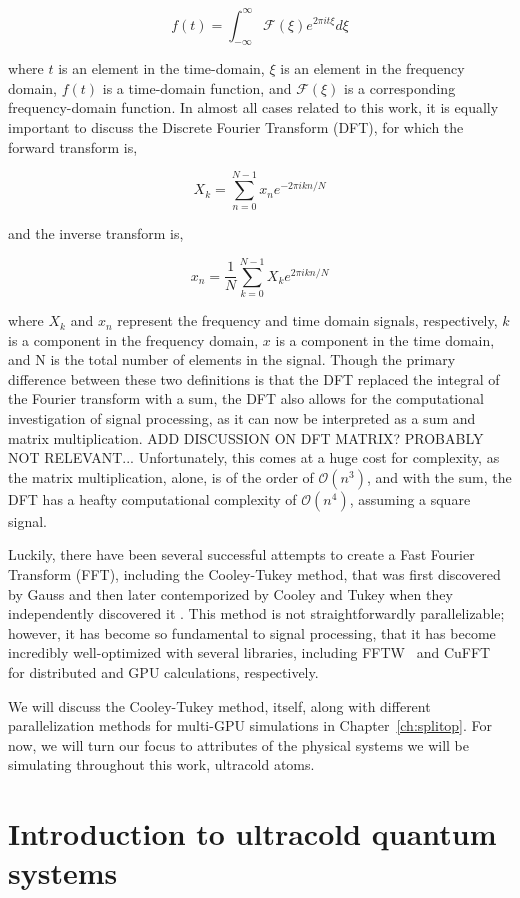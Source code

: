 $$
f(t) = \int_{-\infty}^{\infty}\mathcal{F}(\xi)e^{2\pi i t \xi}d\xi
$$

\noindent where $t$ is an element in the time-domain, $\xi$ is an element in the frequency domain, $f(t)$ is a time-domain function, and $\mathcal{F}(\xi)$ is a corresponding frequency-domain function.
In almost all cases related to this work, it is equally important to discuss the Discrete Fourier Transform (DFT), for which the forward transform is,

$$
X_k = \sum_{n=0}^{N-1} x_n e^{-2 \pi i k n / N}
$$

\noindent and the inverse transform is,

$$
x_n = \frac{1}{N} \sum_{k=0}^{N-1} X_k e^{2 \pi i k n / N}
$$

\noindent where $X_k$ and $x_n$ represent the frequency and time domain signals, respectively, $k$ is a component in the frequency domain, $x$ is a component in the time domain, and N is the total number of elements in the signal.
Though the primary difference between these two definitions is that the DFT replaced the integral of the Fourier transform with a sum, the DFT also allows for the computational investigation of signal processing, as it can now be interpreted as a sum and matrix multiplication.
ADD DISCUSSION ON DFT MATRIX? PROBABLY NOT RELEVANT...
Unfortunately, this comes at a huge cost for complexity, as the matrix multiplication, alone, is of the order of $\mathcal{O}(n^3)$, and with the sum, the DFT has a heafty computational complexity of $\mathcal{O}(n^4)$, assuming a square signal.

Luckily, there have been several successful attempts to create a Fast Fourier Transform (FFT), including the Cooley-Tukey method, that was first discovered by Gauss and then later contemporized by Cooley and Tukey when they independently discovered it \cite{cooley1965}.
This method is not straightforwardly parallelizable; however, it has become so fundamental to signal processing, that it has become incredibly well-optimized with several libraries, including FFTW~\cite{frigo1998} and CuFFT~\cite{fatica2008} for distributed and GPU calculations, respectively.

We will discuss the Cooley-Tukey method, itself, along with different parallelization methods for multi-GPU simulations in Chapter~\ref{ch:splitop}.
For now, we will turn our focus to attributes of the physical systems we will be simulating throughout this work, ultracold atoms.

\section{Introduction to ultracold quantum systems}

